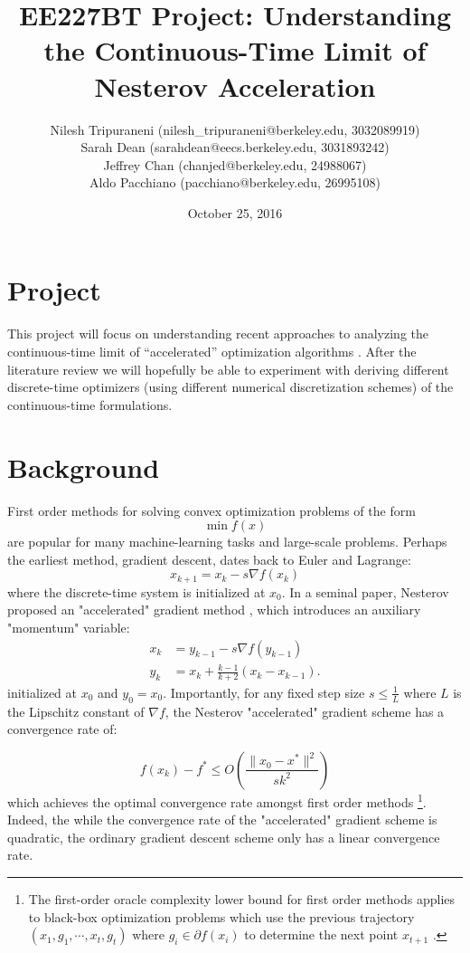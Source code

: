 \documentclass{article}
\title{EE227BT Project:
Understanding the Continuous-Time Limit of Nesterov Acceleration}
\author{Nilesh Tripuraneni (nilesh\_tripuraneni@berkeley.edu, 3032089919)\\ Sarah Dean (sarahdean@eecs.berkeley.edu, 3031893242)\\ Jeffrey Chan (chanjed@berkeley.edu, 24988067)\\ Aldo Pacchiano (pacchiano@berkeley.edu, 26995108)}
\date{October 25, 2016}
\begin{document}
\maketitle


\section{Project}

This project will focus on understanding recent approaches to analyzing the continuous-time limit of ``accelerated'' optimization algorithms \cite{su2014differential, wibisono2016variational, krichene2015accelerated}. After
the literature review we will hopefully be able to experiment with deriving different discrete-time optimizers (using different numerical discretization schemes) of the continuous-time formulations.

\section{Background}
First order methods for solving convex optimization problems of the form
\[\min f(x)\]
are popular for many machine-learning tasks and large-scale problems. Perhaps the earliest method, gradient descent, dates back to Euler and Lagrange:
\[x_{k+1} = x_k - s \nabla f(x_k)\]
where the discrete-time system is initialized at $x_0$. In a seminal paper, Nesterov proposed an "accelerated" gradient method \cite{nesterov1983method}, which introduces an auxiliary "momentum" variable:
\begin{align*}
    x_k &= y_{k-1} - s \nabla f(y_{k-1})\\
    y_k &= x_k + \frac{k-1}{k+2} (x_k - x_{k-1}).
\end{align*}
initialized at $x_0$ and $y_0 = x_0$. Importantly, 
for any fixed step size $s \leq \frac{1}{L}$ where $L$ is the Lipschitz constant of $\nabla f$, the Nesterov "accelerated" gradient scheme has a convergence rate of:
 
\begin{equation}
f(x_k) - f^* \leq O \left(\frac{\|x_0 - x^*\|^2}{sk^2} \right)
\end{equation}
which achieves the optimal convergence rate amongst first order methods \footnote{The first-order oracle complexity lower bound for first order methods applies to black-box optimization problems which use the previous trajectory $(x_1, g_1, \cdots, x_t, g_t)$ where $g_i \in \partial f(x_i)$ to determine the next point $x_{t+1}$ \cite{blair1985problem, nesterov2004introductory}.}. Indeed, the while the convergence rate of the "accelerated" gradient scheme is quadratic, the ordinary gradient descent scheme only has a linear convergence rate.
\end{document}
